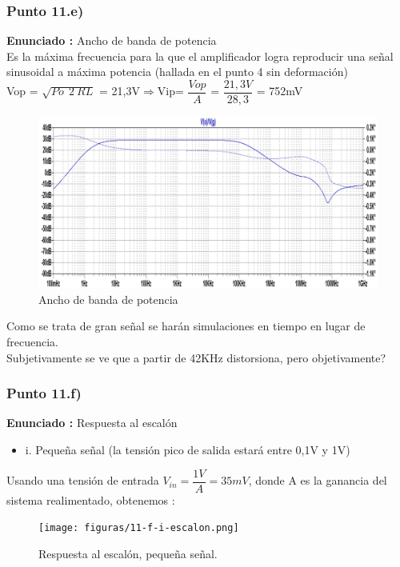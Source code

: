 \documentclass[12pt]{book}
\begin{document}
\subsubsection{Punto 11.e)}
\textbf{Enunciado : } Ancho de banda de potencia\\
Es la máxima frecuencia para la que el amplificador logra reproducir una señal sinusoidal a máxima potencia (hallada en el punto 4 sin deformación)\\[1cm]
Vop = $\sqrt{Po\:\:2\:RL}$ = 21,3V\qquad $\Longrightarrow$\qquad Vip= $\dfrac{Vop}{A}$ = $\dfrac{21,3V}{28,3}$ = 752mV
\begin{figure}[H]
\centering
\includegraphics[scale=0.4]{figuras/11-e-BWdePot.png}
\caption{Ancho de banda de potencia}
\label{figura11e}
\end{figure}
Como se trata de gran señal se harán simulaciones en tiempo en lugar de frecuencia.\\
Subjetivamente se ve que a partir de 42KHz distorsiona, pero objetivamente?

\subsubsection{Punto 11.f)}
\textbf{Enunciado : } Respuesta al escalón\\
\begin{itemize}

\item i. Pequeña señal (la tensión pico de salida estará entre 0,1V y 1V)
\end{itemize}
Usando una tensión de entrada $V_{in}=\dfrac{1V}{A}=35mV$, donde A es la ganancia del sistema realimentado, obtenemos :
\begin{figure}[H]
\centering
\texttt{[image: figuras/11-f-i-escalon.png]}
\caption{Respuesta al escalón, pequeña señal.}
\label{figura11fi}
\end{figure}
\end{document}
